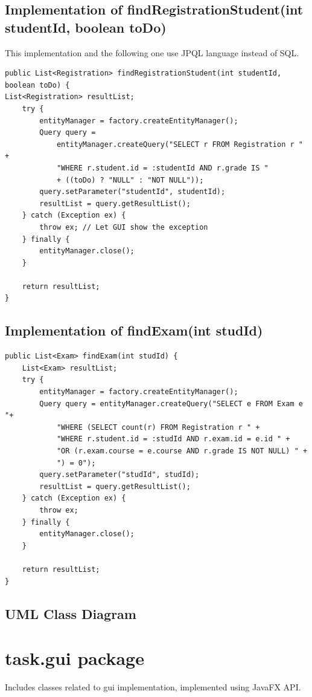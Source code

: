 \documentclass{report}
\begin{document}
\subsection*{Implementation of findRegistrationStudent(int studentId, boolean toDo)}
This implementation and the following one use JPQL language instead of SQL.
\begin{lstlisting}
public List<Registration> findRegistrationStudent(int studentId, boolean toDo) {
List<Registration> resultList;
	try {
		entityManager = factory.createEntityManager();
		Query query =
			entityManager.createQuery("SELECT r FROM Registration r " +
			"WHERE r.student.id = :studentId AND r.grade IS "
			+ ((toDo) ? "NULL" : "NOT NULL"));
		query.setParameter("studentId", studentId);
		resultList = query.getResultList();
	} catch (Exception ex) {
		throw ex; // Let GUI show the exception
	} finally {
		entityManager.close();
	}

	return resultList;
}
\end{lstlisting}

\subsection*{Implementation of findExam(int studId)}
\begin{lstlisting}
public List<Exam> findExam(int studId) {
	List<Exam> resultList;
	try {
		entityManager = factory.createEntityManager();
		Query query = entityManager.createQuery("SELECT e FROM Exam e "+
			"WHERE (SELECT count(r) FROM Registration r " +
			"WHERE r.student.id = :studId AND r.exam.id = e.id " +
			"OR (r.exam.course = e.course AND r.grade IS NOT NULL) " +
			") = 0");
		query.setParameter("studId", studId);
		resultList = query.getResultList();
	} catch (Exception ex) {
		throw ex;
	} finally {
		entityManager.close();
	}

	return resultList;
}
\end{lstlisting}

\subsection*{UML Class Diagram}


\section*{task.gui package}
Includes classes related to gui implementation, implemented using JavaFX API.
\end{document}

